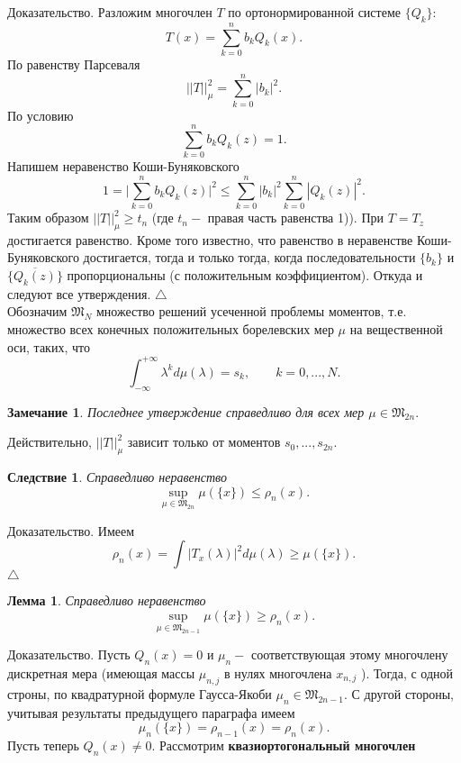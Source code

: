 \documentclass[12pt,a4paper]{article}
\theoremstyle{plain}   \newtheorem{Pro}{Задача}
\newtheorem{Rem}{Замечание}
\newtheorem{Cor}{Следствие}
\newtheorem{Lem}{Лемма}
\begin{document}
{\Large Доказательство.}
Разложим многочлен
$ T $
по ортонормированной системе
$ \{ Q_k \} : $
$$
  T(x)=\sum _{k=0}^n b_k Q_k (x) .
$$
По равенству Парсеваля
$$
  ||T||_{\mu}^2 =\sum _{k=0}^n |b_k |^2 .
$$
По условию
$$
  \sum _{k=0}^n b_k Q_k (z) =1 .
$$
Напишем неравенство Коши-Буняковского
$$
  1= \Biggl | \sum _{k=0}^n b_k Q_k (z) \Biggr | ^2
  \leq \sum _{k=0}^n |b_k |^2 \sum _{k=0}^n |Q_k (z)|^2 .
$$
Таким образом
$ ||T||_{\mu}^2 \geq t_n $
(где
$ t_n - $
правая часть равенства 1)). При
$ T=T_z $
достигается равенство. Кроме того известно, что равенство
в неравенстве Коши-Буняковского достигается, тогда и только тогда,
когда  последовательности
$ \{ b_k \} $
и
$ \{ \overline {Q_k (z) } \} $
пропорциональны (с положительным коэффициентом).
Откуда и следуют все утверждения.
$ \triangle $
\\
Обозначим
$ \mathfrak{M}_N $
множество решений усеченной проблемы моментов, т.е. множество
всех конечных положительных борелевских мер
$ \mu $
на вещественной оси, таких, что
$$
  \int _{-\infty}^{+\infty} \lambda ^k d\mu (\lambda )=
  s_k , \qquad k=0,...,N .
$$
\begin{Rem}
Последнее утверждение справедливо для всех мер
$ \mu \in \mathfrak{M}_{2n} . $
\end{Rem}
Действительно,
$ ||T||_{\mu}^2 $
зависит только от моментов
$ s_0 ,..., s_{2n} . $
\begin{Cor}
Справедливо неравенство
$$
  \sup _{\mu \in \mathfrak{M}_{2n}} \mu (\{ x \} )
  \leq \rho _n (x) .
$$
\end{Cor}
{\Large Доказательство.}
Имеем
$$
  \rho _n (x)=\int |T_x (\lambda )|^2d\mu (\lambda )
  \geq \mu ( \{ x \} ).
$$
$ \triangle $
\begin{Lem}
Справедливо неравенство
$$
  \sup _{\mu \in \mathfrak{M}_{2n-1}}
  \mu ( \{ x \} ) \geq \rho _n (x).
$$
\end{Lem}
{\Large Доказательство.}
Пусть
$ Q_n (x)=0 $
и
$ \mu _n - $
соответствующая этому многочлену дискретная мера
(имеющая массы
$ \mu _{n,j} $
в нулях многочлена
$ x_{n,j} $
). Тогда, с одной строны, по квадратурной формуле Гаусса-Якоби
$ \mu_n \in \mathfrak{M}_{2n-1} . $
С другой стороны, учитывая результаты предыдущего параграфа
имеем
$$
  \mu _n ( \{ x \} ) = \rho _{n-1}(x) =\rho _n (x) .
$$
Пусть теперь
$ Q_n (x) \not = 0. $
Рассмотрим
{\bfseries квазиортогональный многочлен}
\end{document}
